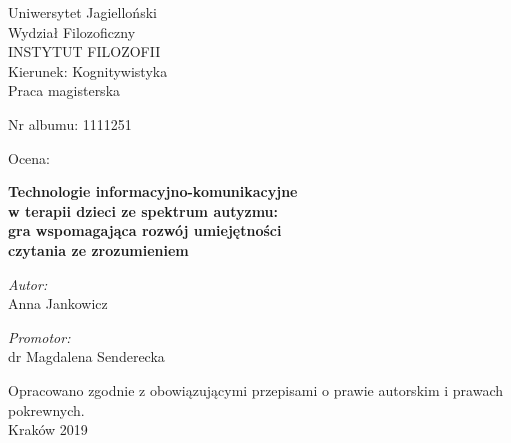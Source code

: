 \documentclass[a4paper,12pt]{report}
\title{\titlepl}
\author{\authorname}
\date{2019}
\newcommand{\authorname}{Anna Jankowicz}
\newcommand{\supname}{dr Magdalena Senderecka}
\newcommand{\titlepl}{Technologie informacyjno-komunikacyjne\\w terapii dzieci ze spektrum autyzmu:\\gra wspomagająca rozwój umiejętności\\czytania ze zrozumieniem}
\begin{document}

\thispagestyle{empty}

\vspace*{0.5cm}
{\centering\linespread{1.5}
    {\Large Uniwersytet Jagielloński\\Wydział Filozoficzny\\
        \uppercase{Instytut Filozofii}\\}
    {\large Kierunek: Kognitywistyka\\Praca magisterska\\}
}

\vspace{1cm}
\begin{minipage}[t]{0.4\textwidth}
    \begin{flushleft} \large Nr albumu: 1111251\\ \end{flushleft}
\end{minipage}
\begin{minipage}[t]{0.4\textwidth}
    \begin{flushright} \large Ocena:\\ \end{flushright}
\end{minipage}
\vspace{1cm}

{\centering\linespread{1.5}\LARGE\textbf{\titlepl\\}}

\vspace{2cm}
\begin{minipage}[t]{0.4\textwidth}
    \begin{flushleft} \large
    \emph{Autor:}\\ \authorname
    \end{flushleft}
\end{minipage}
\begin{minipage}[t]{0.5\textwidth}
    \begin{flushright} \large
    \emph{Promotor:}\\ \supname
    \end{flushright}
\end{minipage}
\vspace{1cm}

{\centering Opracowano zgodnie z obowiązującymi przepisami o prawie autorskim i prawach pokrewnych.\\ \vspace{0.7cm}\large{Kraków 2019\\}}
\end{document}
